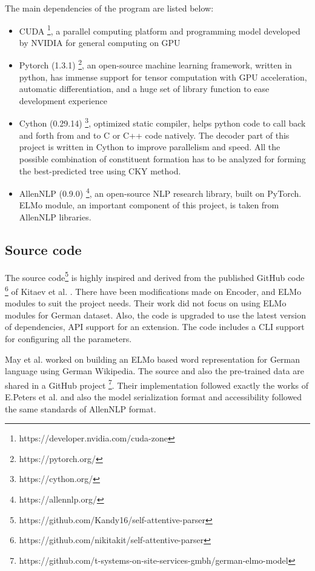\documentclass[a4paper, 11pt]{article}
\begin{document}
The main dependencies of the program are listed below:
\begin{itemize}
\item CUDA \footnote{https://developer.nvidia.com/cuda-zone}, a parallel computing platform and programming model developed by NVIDIA for general computing on GPU
\item Pytorch (1.3.1) \footnote{https://pytorch.org/}, an open-source machine learning framework, written in python, has immense support for tensor computation with GPU acceleration, automatic differentiation, and a huge set of library function to ease development experience
\item Cython (0.29.14) \footnote{https://cython.org/}, optimized static compiler, helps python code to call back and forth from and to C or C++ code natively. The decoder part of this project is written in Cython to improve parallelism and speed. All the possible combination of constituent formation has to be analyzed for forming the best-predicted tree using CKY method.
\item AllenNLP (0.9.0) \footnote{https://allennlp.org/}, an open-source NLP research library, built on PyTorch. ELMo module, an important component of this project, is taken from AllenNLP libraries.  
\end{itemize}

\subsection{Source code}

The source code\footnote{https://github.com/Kandy16/self-attentive-parser} is highly inspired and derived from the published GitHub code \footnote{https://github.com/nikitakit/self-attentive-parser} of Kitaev et al. \parencite*{Kitaev2019}. There have been modifications made on Encoder, and ELMo modules to suit the project needs. Their work did not focus on using ELMo modules for German dataset. Also, the code is upgraded to use the latest version of dependencies, API support for an extension. The code includes a CLI support for configuring all the parameters.


May et al. \parencite*{GerElmo} worked on building an ELMo based word representation for German language using German Wikipedia. The source and also the pre-trained data are shared in a GitHub project \footnote{https://github.com/t-systems-on-site-services-gmbh/german-elmo-model}. Their implementation followed exactly the works of E.Peters et al. \parencite{peters2018deep} and also the model serialization format and accessibility followed the same standards of AllenNLP format.
\end{document}
